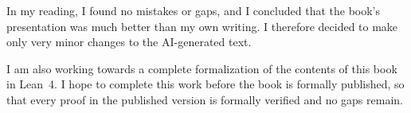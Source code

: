 In my reading, I found no mistakes or gaps, and I concluded that the book's presentation was much better than my own writing. I therefore decided to make only very minor changes to the AI-generated text.

I am also working towards a complete formalization of the contents of this book in Lean~4. I hope to complete this work before the book is formally published, so that every proof in the published version is formally verified and no gaps remain.
